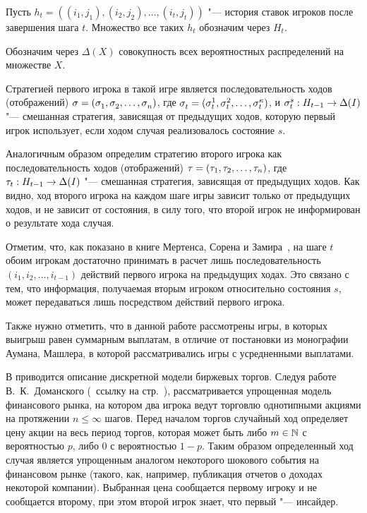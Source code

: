 Пусть $h_t = \left((i_1, j_1), (i_2, j_2), \ldots, (i_t, j_t)\right)$ "--- история ставок игроков после завершения шага $t$.
Множество все таких $h_t$ обозначим через $H_t$. 

Обозначим через $\Delta(X)$ совокупность всех вероятностных распределений на множестве $X$.

Стратегией первого игрока в такой игре является последовательность ходов (отображений) $\sigmar = (\sigmas{1}, \sigmas{2}, \ldots, \sigmas{n})$, где $\sigmas{t} = (\sigmas[1]{t}, \sigmas[2]{t}, \ldots, \sigmas[\kappa]{t})$, и $\sigmas[s]{t}: H_{t-1} \rightarrow \Delta(I)$ "--- смешанная стратегия, зависящая от предыдущих ходов, которую первый игрок использует, если ходом случая реализовалось состояние $s$.

Аналогичным образом определим стратегию второго игрока как последовательность ходов (отображений) $\tau = (\tau_{1}, \tau_{2}, \ldots, \tau_{n})$, где $\tau_{t}: H_{t-1} \rightarrow \Delta(I)$ "--- смешанная стратегия, зависящая от предыдущих ходов.
Как видно, ход второго игрока на каждом шаге игры зависит только от предыдущих ходов, и не зависит от состояния, в силу того, что второй игрок не информирован о результате хода случая.

Отметим, что, как показано в книге Мертенса, Сорена и Замира~\cite{mertens15}, на шаге $t$ обоим игрокам достаточно принимать в расчет лишь последовательность $(i_1, i_2, \ldots, i_{t-1})$ действий первого игрока на предыдущих ходах.
Это связано с тем, что информация, получаемая вторым игроком относительно состояния $s$, может передаваться лишь посредством действий первого игрока.

Также нужно отметить, что в данной работе рассмотрены игры, в которых выигрыш равен суммарным выплатам, в отличие от постановки из монографии Аумана, Машлера, в которой рассматривались игры с усредненными выплатами.

В  приводится описание дискретной модели биржевых торгов.
Следуя работе В.~К.~Доманского (\seename~ссылку на стр.~\pageref{domansky07ref}), рассматривается упрощенная модель финансового рынка, на котором два игрока ведут торговлю однотипными акциями на протяжении $n \leqslant \infty$ шагов.
%
Перед началом торгов случайный ход определяет цену акции на весь период торгов, которая может быть либо $m \in \mathbb{N}$ с вероятностью $p$, либо $0$ с вероятностью $1-p$.
Таким образом определенный ход случая является упрощенным аналогом некоторого шокового события на финансовом рынке (такого, как, например, публикация отчетов о доходах некоторой компании).
Выбранная цена сообщается первому игроку и не сообщается второму, при этом второй игрок знает, что первый "--- инсайдер.


